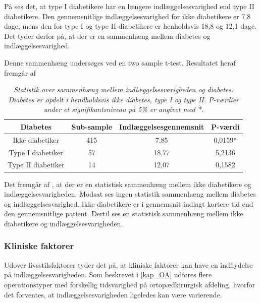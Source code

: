 \noindent
På  ses det, at type I diabetikere har en længere indlæggelsesvarighed end type II diabetikere. Den gennemsnitlige indlæggelsesvarighed for ikke diabetikere er 7,8 dage, mens den for type I og type II diabetikere er henholdsvis 18,8 og 12,1 dage. Det tyder derfor på, at der er en sammenhæng mellem diabetes og indlæggelsesvarighed. 

Denne sammenhæng undersøges ved en two sample t-test. Resultatet heraf fremgår af 

\begin{table}[H]
\centering
\begin{tabular}{|c|c|c|c|}
\hline
\textbf{Diabetes}  & \textbf{Sub-sample} & \textbf{Indlæggelsesgennemsnit} & \textbf{P-værdi} \\ \hline
Ikke diabetiker    & 415                 & 7,85                            & 0,0159*          \\ \hline
Type I diabetiker  & 57                  & 18,77                           & 5,2136           \\ \hline
Type II diabetiker & 14                  & 12,07                           & 0,1582           \\ \hline
\end{tabular}
\caption{\textit{Statistik over sammenhæng mellem indlæggelsesvarigheden og diabetes. Diabetes er opdelt i hendholdsvis ikke diabetes, type I og type II. P-værdier under et signifikantsniveau på 5\% er angivet med *.}}
\label{diabetesindlaegtab}
\end{table}

\noindent
Det fremgår af , at der er en statistisk sammenhæng mellem ikke diabetikere og indlæggelsesvarigheden. Modsat ses ingen statistik sammenhæng mellem diabetes og indlæggelsesvarighed. Ikke diabetikere er i gennemsnit indlagt kortere tid end den gennemsnitlige patient. Dertil ses en statistisk sammenhæng mellem ikke diabetikere og indlæggelsesvarigheden.

\subsubsection{Kliniske faktorer}
Udover livsstilsfaktorer tyder det på, at kliniske faktorer kan have en indflydelse på indlæggelsesvarigheden. Som beskrevet i \ref{kap_OA} udføres flere operationstyper med forskellig tidsvarighed på ortopædkirurgisk afdeling, hvorfor det forventes, at indlæggelsesvarigheden ligeledes kan være varierende. 


